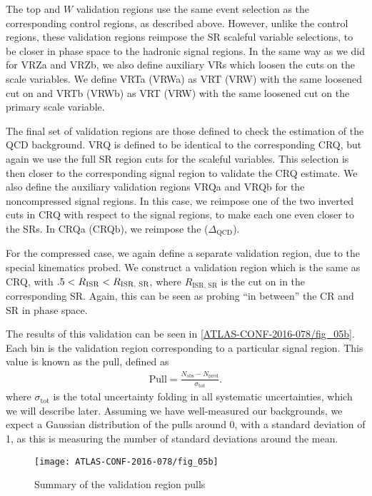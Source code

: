 The top and $W$ validation regions use the same event selection as the corresponding control regions, as described above.
However, unlike the control regions, these validation regions reimpose the SR scaleful variable selections, to be closer in phase space to the hadronic signal regions.
In the same way as we did for VRZa and VRZb, we also define auxiliary VRs which loosen the cuts on the scale variables.
We define VRTa (VRWa) as VRT (VRW) with the same loosened cut on  and VRTb (VRWb) as VRT (VRW) with the same loosened cut on the primary scale variable.

The final set of validation regions are those defined to check the estimation of the QCD background.
VRQ is defined to be identical to the corresponding CRQ, but again we use the full SR region cuts for the scaleful variables.
This selection is then closer to the corresponding signal region to validate the CRQ estimate.
We also define the auxiliary validation regions VRQa and VRQb for the noncompressed signal regions.
In this case, we reimpose one of the two inverted cuts in CRQ with respect to the signal regions, to make each one even closer to the SRs.
In CRQa (CRQb), we reimpose the  ($\Delta_{\mathrm{QCD}}$).

For the compressed case, we again define a separate validation region, due to the special kinematics probed.
We construct a validation region which is the same as CRQ, with $.5 < R_{\text{ISR}} < R_{\text{ISR, SR}}$, where $R_{\text{ISR, SR}}$ is the cut on \risr in the corresponding SR.
Again, this can be seen as probing ``in between'' the CR and SR in phase space.

The results of this validation can be seen in \ref{ATLAS-CONF-2016-078/fig_05b}.
Each bin is the validation region corresponding to a particular signal region.
This value is known as the pull, defined as
\begin{align}
\text{Pull} = \frac{N_{\mathrm{obs}} - N_{\mathrm{pred}}}{\sigma_{\mathrm{tot}}}.
\end{align}
where $\sigma_{\mathrm{tot}}$ is the total uncertainty folding in all systematic uncertainties, which we will describe later.
Assuming we have well-measured our backgrounds, we expect a Gaussian distribution of the pulls around 0, with a standard deviation of 1, as this is measuring the number of standard deviations around the mean.
\begin{figure}
\caption{Summary of the validation region pulls} \label{fig:vr_summary}
\texttt{[image: ATLAS-CONF-2016-078/fig\_05b]}
\end{figure}

